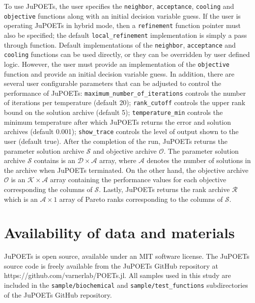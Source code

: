 \documentclass{bmcart}
\begin{document}
To use JuPOETs, the user specifies the \texttt{neighbor}, \texttt{acceptance}, \texttt{cooling} and \texttt{objective} functions along with an initial decision variable guess.
If the user is operating JuPOETs in hybrid mode, then a \texttt{refinement} function pointer must also be specified; the default \texttt{local\_refinement} implementation is simply a pass through function. Default implementations of the \texttt{neighbor}, \texttt{acceptance} and \texttt{cooling} functions can be used directly, or they can be overridden by user defined logic. However, the user must provide an implementation of the \texttt{objective} function and provide an initial decision variable guess.
In addition, there are several user configurable parameters that can be adjusted to control the performance of JuPOETs:
\texttt{maximum\_number\_of\_iterations} controls the number of iterations per temperature (default 20);
\texttt{rank\_cutoff} controls the upper rank bound on the solution archive (default 5);
\texttt{temperature\_min} controls the minimum temperature after which JuPOETs returns the error and solution archives (default 0.001);
\texttt{show\_trace} controls the level of output shown to the user (default true).
After the completion of the run, JuPOETs returns the parameter solution archive $\mathcal{S}$ and objective archive $\mathcal{O}$.
The parameter solution archive $\mathcal{S}$ contains is an $\mathcal{D}\times\mathcal{A}$ array, where $\mathcal{A}$ denotes the number of solutions in the archive when
JuPOETs terminated. On the other hand, the objective archive $\mathcal{O}$ is an $\mathcal{K}\times\mathcal{A}$ array containing the performance values for each objective corresponding the columns of $\mathcal{S}$. Lastly, JuPOETs returns the rank archive $\mathcal{R}$ which is an $\mathcal{A}\times{1}$ array of Pareto ranks corresponding to the
columns of $\mathcal{S}$.

\section*{Availability of data and materials}
JuPOETs is open source, available under an MIT software license.
The JuPOETs source code is freely available from the JuPOETs GitHub repository at https://github.com/varnerlab/POETs.jl.
All samples used in this study are included in the \texttt{sample/biochemical} and \texttt{sample/test\_functions} subdirectories of the JuPOETs GitHub repository.
\end{document}
